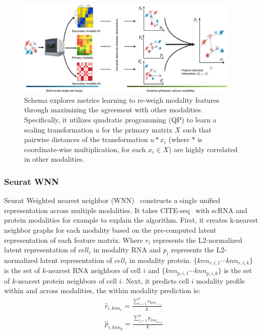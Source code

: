 \begin{figure}[!hb]
	\centering
	\includegraphics[width=0.95\textwidth]{Alg_Schema/fig}
	\vspace{0.1cm}
	\caption[Illustration of Schema integration competing method.]{
	Schema explores metrics learning to re-weigh modality features through maximizing the agreement with other modalities. Specifically, it utilizes quadratic programming (QP) to learn a scaling transformation $u$ for the primary matrix $X$ such that pairwise distances of the transformation $u * x_i$ (where $*$ is coordinate-wise multiplication, for each $x_i\in X$) are highly correlated in other modalities.
}
	\label{fig:Alg_MOFA}
\end{figure}


\subsubsection{Seurat WNN}
Seurat Weighted nearest neighbor (WNN)~\citep{hao2021seurat4} constructs a single unified representation across multiple modalities. It takes CITE-seq~\cite{citeseq2017} with scRNA and protein modalities for example to explain the algorithm. First, it creates k-nearest neighbor graphs for each modality based on the pre-computed latent representation of each feature matrix. Where $r_i$ represents the L2-normalized latent representation of $cell_i$ in modality RNA and $p_i$ represents the L2-normalized latent representation of $cell_i$ in modality protein. $\{knn_{r,i,1}\cdots knn_{r,i,k}\}$ is the set of $k$-nearest RNA neighbors of cell $i$ and $\{knn_{p,i,1}\cdots knn_{p,i,k}\}$ is the set of $k$-nearest protein neighbors of cell $i$. Next, it predicts cell $i$ modality profile within and across modalities, the within modality prediction is:
\begin{equation}
	\begin{aligned}
		&\hat{r}_{i, knn_r}=\frac{\sum_{j=1}^{k} r_{k n n_{r, i, j}}}{k} \\
		&\hat{p}_{i, knn_p}=\frac{\sum_{j=1}^{k} p_{k n n_{p, i, j}}}{k} 
	\end{aligned}
\end{equation}

